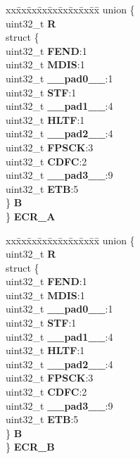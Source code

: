 \begin{DoxyCompactItemize}
\begin{tabbing}
\end{tabbing}\item 
\mbox{\label{structETPU__tag_adb21143b1b524405267447e7a3711d04}} 
\begin{tabbing}
xx\=xx\=xx\=xx\=xx\=xx\=xx\=xx\=xx\=\kill
union \{\\
\>uint32\_t {\bfseries R}\\
\>struct \{\\
\>\>uint32\_t {\bfseries FEND}:1\\
\>\>uint32\_t {\bfseries MDIS}:1\\
\>\>uint32\_t {\bfseries \_\_pad0\_\_}:1\\
\>\>uint32\_t {\bfseries STF}:1\\
\>\>uint32\_t {\bfseries \_\_pad1\_\_}:4\\
\>\>uint32\_t {\bfseries HLTF}:1\\
\>\>uint32\_t {\bfseries \_\_pad2\_\_}:4\\
\>\>uint32\_t {\bfseries FPSCK}:3\\
\>\>uint32\_t {\bfseries CDFC}:2\\
\>\>uint32\_t {\bfseries \_\_pad3\_\_}:9\\
\>\>uint32\_t {\bfseries ETB}:5\\
\>\} {\bfseries B}\\
\} {\bfseries ECR\_A}\\

\end{tabbing}\item 
\mbox{\label{structETPU__tag_a9f220ad9c1a7dde6568017b3381ddc9c}} 
\begin{tabbing}
xx\=xx\=xx\=xx\=xx\=xx\=xx\=xx\=xx\=\kill
union \{\\
\>uint32\_t {\bfseries R}\\
\>struct \{\\
\>\>uint32\_t {\bfseries FEND}:1\\
\>\>uint32\_t {\bfseries MDIS}:1\\
\>\>uint32\_t {\bfseries \_\_pad0\_\_}:1\\
\>\>uint32\_t {\bfseries STF}:1\\
\>\>uint32\_t {\bfseries \_\_pad1\_\_}:4\\
\>\>uint32\_t {\bfseries HLTF}:1\\
\>\>uint32\_t {\bfseries \_\_pad2\_\_}:4\\
\>\>uint32\_t {\bfseries FPSCK}:3\\
\>\>uint32\_t {\bfseries CDFC}:2\\
\>\>uint32\_t {\bfseries \_\_pad3\_\_}:9\\
\>\>uint32\_t {\bfseries ETB}:5\\
\>\} {\bfseries B}\\
\} {\bfseries ECR\_B}\\


\end{tabbing}
\end{DoxyCompactItemize}
